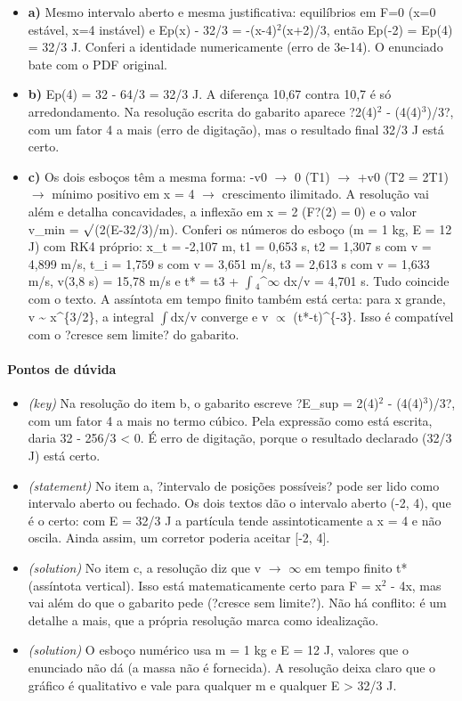 \documentclass{article}%
\begin{document}
\begin{itemize}%
\item%
\textbf{a)} Mesmo intervalo aberto e mesma justificativa: equilíbrios em F=0 (x=0 estável, x=4 instável) e Ep(x) - 32/3 = -(x-4)$^2$(x+2)/3, então Ep(-2) = Ep(4) = 32/3 J. Conferi a identidade numericamente (erro de 3e{-}14). O enunciado bate com o PDF original.%
\item%
\textbf{b)} Ep(4) = 32 - 64/3 = 32/3 J. A diferença 10,67 contra 10,7 é só arredondamento. Na resolução escrita do gabarito aparece ?2(4)$^2$ - (4(4)$^3$)/3?, com um fator 4 a mais (erro de digitação), mas o resultado final 32/3 J está certo.%
\item%
\textbf{c)} Os dois esboços têm a mesma forma: -v0 $\to$ 0 (T1) $\to$ +v0 (T2 = 2T1) $\to$ mínimo positivo em x = 4 $\to$ crescimento ilimitado. A resolução vai além e detalha concavidades, a inflexão em x = 2 (F?(2) = 0) e o valor v\_min = $\surd$(2(E-32/3)/m). Conferi os números do esboço (m = 1 kg, E = 12 J) com RK4 próprio: x\_t = -2,107 m, t1 = 0,653 s, t2 = 1,307 s com v = 4,899 m/s, t\_i = 1,759 s com v = 3,651 m/s, t3 = 2,613 s com v = 1,633 m/s, v(3,8 s) = 15,78 m/s e t* = t3 + $\int$$_{4}$\^{}$\infty$ dx/v = 4,701 s. Tudo coincide com o texto. A assíntota em tempo finito também está certa: para x grande, v \textasciitilde{} x\^{}\{3/2\}, a integral $\int$dx/v converge e v $\propto$ (t*-t)\^{}\{-3\}. Isso é compatível com o ?cresce sem limite? do gabarito.%
\end{itemize}%
\paragraph{Pontos de dúvida}%
\begin{itemize}%
\item%
\textit{(key)} Na resolução do item b, o gabarito escreve ?E\_sup = 2(4)$^2$ - (4(4)$^3$)/3?, com um fator 4 a mais no termo cúbico. Pela expressão como está escrita, daria 32 - 256/3 < 0. É erro de digitação, porque o resultado declarado (32/3 J) está certo.%
\item%
\textit{(statement)} No item a, ?intervalo de posições possíveis? pode ser lido como intervalo aberto ou fechado. Os dois textos dão o intervalo aberto (-2, 4), que é o certo: com E = 32/3 J a partícula tende assintoticamente a x = 4 e não oscila. Ainda assim, um corretor poderia aceitar {[}-2, 4{]}.%
\item%
\textit{(solution)} No item c, a resolução diz que v $\to$ $\infty$ em tempo finito t* (assíntota vertical). Isso está matematicamente certo para F = x$^2$ - 4x, mas vai além do que o gabarito pede (?cresce sem limite?). Não há conflito: é um detalhe a mais, que a própria resolução marca como idealização.%
\item%
\textit{(solution)} O esboço numérico usa m = 1 kg e E = 12 J, valores que o enunciado não dá (a massa não é fornecida). A resolução deixa claro que o gráfico é qualitativo e vale para qualquer m e qualquer E > 32/3 J.%
\end{itemize}%
\end{document}

